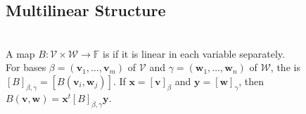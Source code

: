 \subsection{Multilinear Structure}
\begin{definition} \label{def:bilinear-form-and-matrix} \\
A map $B:\mathcal{V}\times\mathcal{W}\to\mathbb{F}$ is  if it is linear in each variable separately.\\
For bases $\beta=(\mathbf{v}_1,\ldots,\mathbf{v}_m)$ of $\mathcal{V}$ and $\gamma=(\mathbf{w}_1,\ldots,\mathbf{w}_n)$ of $\mathcal{W}$, the  is $[B]_{\beta,\gamma}=[B(\mathbf{v}_i,\mathbf{w}_j)]$. If $\mathbf{x}=[\mathbf{v}]_{\beta}$ and $\mathbf{y}=[\mathbf{w}]_{\gamma}$, then $B(\mathbf{v},\mathbf{w})=\mathbf{x}^t [B]_{\beta,\gamma}\mathbf{y}$.
\end{definition}

